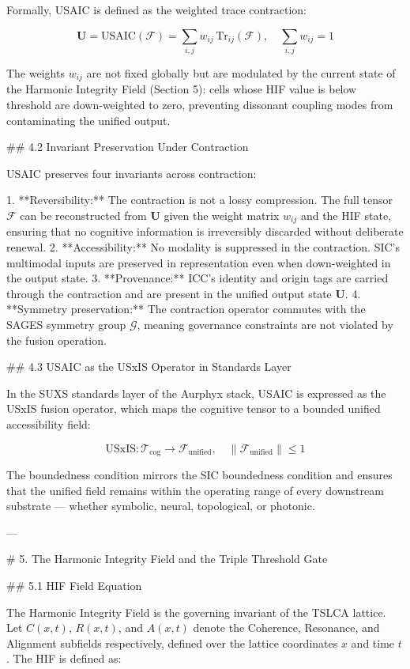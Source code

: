 Formally, USAIC is defined as the weighted trace contraction:

\[
\mathbf{U} = \mathrm{USAIC}(\mathcal{F}) = \sum_{i,j} w_{ij}\,
\mathrm{Tr}_{ij}(\mathcal{F}), \quad \sum_{i,j} w_{ij} = 1
\]

The weights \(w_{ij}\) are not fixed globally but are modulated by the current
state of the Harmonic Integrity Field (Section 5): cells whose HIF value is below
threshold are down-weighted to zero, preventing dissonant coupling modes from
contaminating the unified output.

## 4.2 Invariant Preservation Under Contraction

USAIC preserves four invariants across contraction:

1. **Reversibility:** The contraction is not a lossy compression. The full
   tensor \(\mathcal{F}\) can be reconstructed from \(\mathbf{U}\) given the
   weight matrix \(w_{ij}\) and the HIF state, ensuring that no cognitive
   information is irreversibly discarded without deliberate renewal.
2. **Accessibility:** No modality is suppressed in the contraction. SIC's
   multimodal inputs are preserved in representation even when down-weighted
   in the output state.
3. **Provenance:** ICC's identity and origin tags are carried through the
   contraction and are present in the unified output state \(\mathbf{U}\).
4. **Symmetry preservation:** The contraction operator commutes with the SAGES
   symmetry group \(\mathcal{G}\), meaning governance constraints are not
   violated by the fusion operation.

## 4.3 USAIC as the USxIS Operator in Standards Layer

In the SUXS standards layer of the Aurphyx stack, USAIC is expressed as the
USxIS fusion operator, which maps the cognitive tensor to a bounded unified
accessibility field:

\[
\mathrm{USxIS}: \mathcal{T}_{\text{cog}} \rightarrow \mathcal{F}_{\text{unified}},
\quad \|\mathcal{F}_{\text{unified}}\| \leq 1
\]

The boundedness condition mirrors the SIC boundedness condition and ensures that
the unified field remains within the operating range of every downstream substrate
— whether symbolic, neural, topological, or photonic.

---

# 5. The Harmonic Integrity Field and the Triple Threshold Gate

## 5.1 HIF Field Equation

The Harmonic Integrity Field is the governing invariant of the TSLCA lattice. Let
\(C(x,t)\), \(R(x,t)\), and \(A(x,t)\) denote the Coherence, Resonance, and
Alignment subfields respectively, defined over the lattice coordinates \(x\) and
time \(t\). The HIF is defined as:

